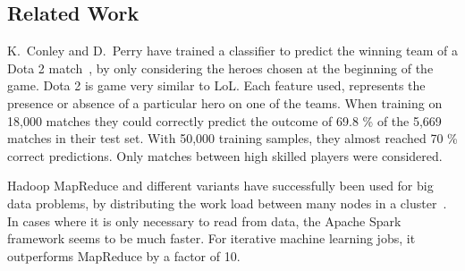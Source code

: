 \subsection{Related Work}\label{sec:relatedwork}

K.\ Conley and D.\ Perry have trained a classifier to predict the winning team of a Dota 2 match~\cite{dota2article}, by only considering the heroes chosen at the beginning of the game. Dota 2 is game very similar to LoL.\@
Each feature used, represents the presence or absence of a particular hero on one of the teams.
When training on 18,000 matches they could correctly predict the outcome of 69.8 \% of the 5,669 matches in their test set.
With 50,000 training samples, they almost reached 70 \% correct predictions. Only matches between high skilled players were considered.



Hadoop MapReduce and different variants have successfully been used for big data problems, by distributing the work load between many nodes in a cluster~\cite{ApacheSpark}.
In cases where it is only necessary to read from data, the Apache Spark framework seems to be much faster.
For iterative machine learning jobs, it outperforms MapReduce by a factor of 10.

